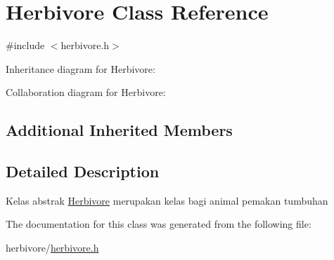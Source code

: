 \hypertarget{classHerbivore}{}\section{Herbivore Class Reference}
\label{classHerbivore}


{\ttfamily \#include $<$herbivore.\+h$>$}



Inheritance diagram for Herbivore\+:


Collaboration diagram for Herbivore\+:
\subsection*{Additional Inherited Members}


\subsection{Detailed Description}
Kelas abstrak \hyperlink{classHerbivore}{Herbivore} merupakan kelas bagi animal pemakan tumbuhan 

The documentation for this class was generated from the following file\+:\begin{DoxyCompactItemize}
\item 
herbivore/\hyperlink{herbivore_8h}{herbivore.\+h}\end{DoxyCompactItemize}
